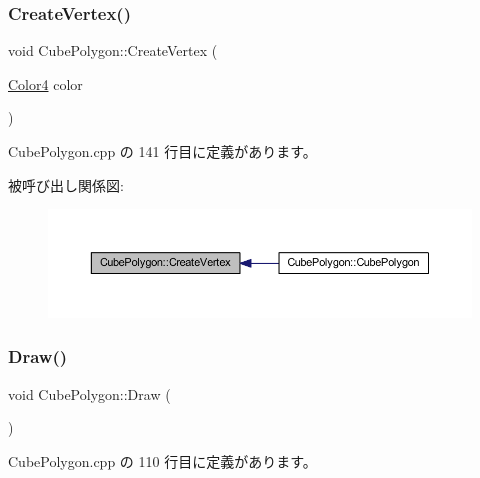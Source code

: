 \subsubsection{\texorpdfstring{Create\+Vertex()}{CreateVertex()}}
{\footnotesize\ttfamily void Cube\+Polygon\+::\+Create\+Vertex (\begin{DoxyParamCaption}\item[{\mbox{\hyperlink{_vector3_d_8h_a9c2339f516cf07ce4753b8a99fab3791}{Color4}}}]{color }\end{DoxyParamCaption})\hspace{0.3cm}{\ttfamily [private]}}



 Cube\+Polygon.\+cpp の 141 行目に定義があります。

被呼び出し関係図\+:\nopagebreak
\begin{figure}[H]
\begin{center}
\leavevmode
\includegraphics[width=350pt]{class_cube_polygon_ae36048a1ae7b13b6bc8571231b372627_icgraph}
\end{center}
\end{figure}
\mbox{\label{class_cube_polygon_ac9003cd00eea402f2b6c5fb5a77feae2}} 
\subsubsection{\texorpdfstring{Draw()}{Draw()}}
{\footnotesize\ttfamily void Cube\+Polygon\+::\+Draw (\begin{DoxyParamCaption}{ }\end{DoxyParamCaption})}



 Cube\+Polygon.\+cpp の 110 行目に定義があります。

